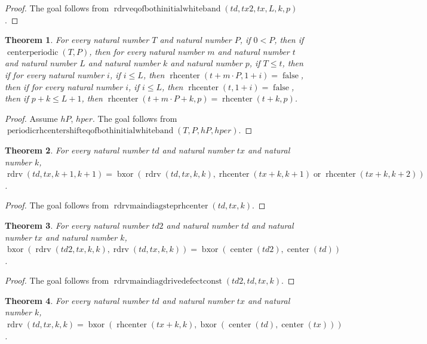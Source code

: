 \documentclass[11pt]{article}
\newtheorem{theorem}{Theorem}[section]
\theoremstyle{definition}
\begin{document}
\begin{proof}
The goal follows from \(\operatorname{rdrveqofbothinitialwhiteband}(td, tx2, tx, L, k, p)\).
\end{proof}
\begin{theorem}
\label{ll:paper:periodic-rhcenter-shift-eq-of-both-initial-white-band}
For every natural number \(T\) and natural number \(P\), if \(0 < P\), then if \(\operatorname{centerperiodic}(T, P)\), then for every natural number \(m\) and natural number \(t\) and natural number \(L\) and natural number \(k\) and natural number \(p\), if \(T \le t\), then if for every natural number \(i\), if \(i \le L\), then \(\operatorname{rhcenter}(t + m \cdot P, 1 + i) = \operatorname{false}\), then if for every natural number \(i\), if \(i \le L\), then \(\operatorname{rhcenter}(t, 1 + i) = \operatorname{false}\), then if \(p + k \le L + 1\), then \(\operatorname{rhcenter}(t + m \cdot P + k, p) = \operatorname{rhcenter}(t + k, p)\).
\end{theorem}
\begin{proof}
Assume \(hP\), \(hper\).
The goal follows from \(\operatorname{periodicrhcentershifteqofbothinitialwhiteband}(T, P, hP, hper)\).
\end{proof}
\begin{theorem}
\label{ll:paper:rdrv-main-diag-step-rhcenter}
For every natural number \(td\) and natural number \(tx\) and natural number \(k\), \(\operatorname{rdrv}(td, tx, k + 1, k + 1) = \operatorname{bxor}(\operatorname{rdrv}(td, tx, k, k), \operatorname{rhcenter}(tx + k, k + 1) \operatorname{or} \operatorname{rhcenter}(tx + k, k + 2))\).
\end{theorem}
\begin{proof}
The goal follows from \(\operatorname{rdrvmaindiagsteprhcenter}(td, tx, k)\).
\end{proof}
\begin{theorem}
\label{ll:paper:rdrv-main-diag-drive-defect-const}
For every natural number \(td2\) and natural number \(td\) and natural number \(tx\) and natural number \(k\), \(\operatorname{bxor}(\operatorname{rdrv}(td2, tx, k, k), \operatorname{rdrv}(td, tx, k, k)) = \operatorname{bxor}(\operatorname{center}(td2), \operatorname{center}(td))\).
\end{theorem}
\begin{proof}
The goal follows from \(\operatorname{rdrvmaindiagdrivedefectconst}(td2, td, tx, k)\).
\end{proof}
\begin{theorem}
\label{ll:paper:rdrv-main-diag-eq-rhcenter-xor-centers}
For every natural number \(td\) and natural number \(tx\) and natural number \(k\), \(\operatorname{rdrv}(td, tx, k, k) = \operatorname{bxor}(\operatorname{rhcenter}(tx + k, k), \operatorname{bxor}(\operatorname{center}(td), \operatorname{center}(tx)))\).
\end{theorem}
\end{document}
